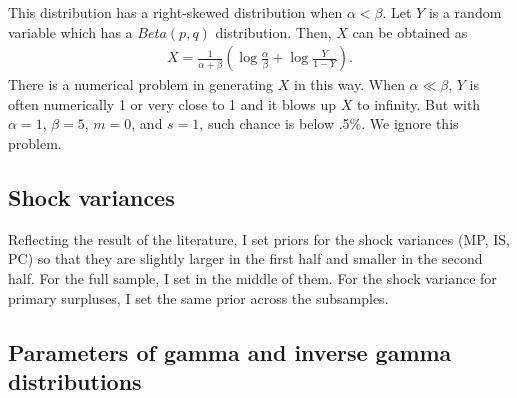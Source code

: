 \documentclass[12pt,reqno,oneside]{amsart}
\theoremstyle{definition}
\theoremstyle{remark}
\begin{document}
This distribution has a right-skewed distribution when $\alpha < \beta$. Let $Y$ is a random variable which has a $Beta(p,q)$ distribution. Then, $X$ can be obtained as
\begin{gather}
  X = \frac{1}{\alpha+\beta}\left( \log\frac{\alpha}{\beta} + \log \frac{Y}{1-Y} \right).
\end{gather}
There is a numerical problem in generating $X$ in this way. When $\alpha \ll \beta$, $Y$ is often numerically 1 or very close to 1 and it blows up $X$ to infinity. But with $\alpha = 1$, $\beta = 5$, $m=0$, and $s=1$, such chance is below .5\%. We ignore this problem.

\subsection{Shock variances}

Reflecting the result of the literature, I set priors for the shock variances (MP, IS, PC) so that they are slightly larger in the first half and smaller in the second half. For the full sample, I set in the middle of them. For the shock variance for primary surpluses, I set the same prior across the subsamples.


\subsection{Parameters of gamma and inverse gamma distributions}
\end{document}
